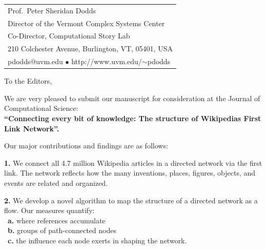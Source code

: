 \documentclass[11pt]{article}
\begin{document}
\sffamily 


{ \small
\begin{tabular}[b]{l}
Prof.\ Peter Sheridan Dodds\\
Director of the Vermont Complex Systems Center\\
Co-Director, Computational Story Lab\\
210 Colchester Avenue, Burlington, VT, 05401, USA\\
pdodds@uvm.edu
$\bullet$
http://www.uvm.edu/{$\sim$}pdodds
\end{tabular}
}


\bigskip
\bigskip

To the Editors,

We are very pleased to submit our manuscript for consideration at the Journal of Computational Science:\\
\textbf{``Connecting every bit of knowledge:
The structure of Wikipedia\textquotesingle s First Link Network''.}

Our major contributions and findings are as follows:

\textbf{1.}
We connect all 4.7 million Wikipedia articles in a directed network via the first link.
The network reflects how the many inventions, places, figures, objects, and events are related and organized.

\textbf{2.}
We develop a novel algorithm to map the structure of a directed network as a flow. Our measures quantify: \\
\mbox{}\ \textbf{a.}
where references accumulate\\
\mbox{}\ \textbf{b.}
groups of path-connected nodes\\
\mbox{}\ \textbf{c.}
the influence each node exerts in shaping the network.
\end{document}
